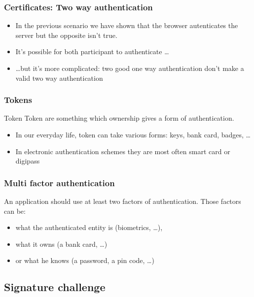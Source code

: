 \begin{frame}
\frametitle{Certificates: Two way authentication}

\begin{itemize}
\item In the previous scenario we have shown that the browser autenticates
the server but the opposite isn't true.

\item It's possible for both participant to authenticate \ldots

\item \ldots but it's more complicated: two good one way
  authentication don't make a valid two way authentication
\end{itemize}

\end{frame} 


\begin{frame}
\frametitle{Tokens}

\begin{block}{Token} Token are something which ownership gives a form
  of authentication.
\end{block}
\begin{itemize}
\item In our everyday life, token can take various forms: keys, bank card,
badges, \ldots
\item In electronic authentication schemes they are most often smart
  card or digipass
\end{itemize}
\end{frame}


\begin{frame}
\frametitle{Multi factor authentication}
 An application should use at least two factors of
 authentication. Those factors can be:
\begin{itemize}
\item what the authenticated entity is (biometrics, \ldots),
\item what it owns (a bank card, \ldots) 
\item or what he knows (a password, a pin code, \ldots)
\end{itemize}
\end{frame}


\subsection{Signature challenge}

